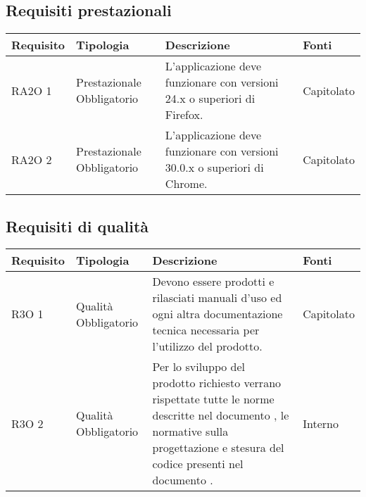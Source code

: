 \subsection{Requisiti prestazionali }

      \begin{center}
      \bgroup
      \def\arraystretch{1.8}
      \begin{longtable}{ | l | p{2cm} | p{5cm} | p{1.7cm} |}
    
      \cellcolor[gray]{0.9} \textbf{Requisito} & \cellcolor[gray]{0.9} \textbf{Tipologia} 
      & \cellcolor[gray]{0.9} \textbf{Descrizione} & \cellcolor[gray]{0.9} \textbf{Fonti} \\ \hline
      
        RA2O 1 & Prestazionale \newline  Obbligatorio  & L’applicazione deve funzionare con versioni 24.x o superiori di Firefox. &  Capitolato \newline  \\ \hline      
        RA2O 2 & Prestazionale \newline  Obbligatorio  & L’applicazione deve funzionare con versioni 30.0.x o superiori di Chrome. &  Capitolato \newline  \\ \hline
      \end{longtable}
      \egroup
      \end{center}  
\clearpage

\subsection{Requisiti di qualità }

      \begin{center}
      \bgroup
      \def\arraystretch{1.8}
      \begin{longtable}{ | l | p{2cm} | p{5cm} | p{1.7cm} |}
    
      \cellcolor[gray]{0.9} \textbf{Requisito} & \cellcolor[gray]{0.9} \textbf{Tipologia} 
      & \cellcolor[gray]{0.9} \textbf{Descrizione} & \cellcolor[gray]{0.9} \textbf{Fonti} \\ \hline
      
        R3O 1 & Qualità \newline  Obbligatorio  & Devono essere prodotti e rilasciati manuali d'uso ed ogni altra documentazione tecnica necessaria per l’utilizzo del prodotto. &  Capitolato \newline  \\ \hline      
        R3O 2 & Qualità \newline  Obbligatorio  & Per lo sviluppo del prodotto richiesto verrano rispettate tutte le norme descritte nel documento \NormeDiProgetto{}, le normative sulla progettazione e stesura del codice presenti nel  documento \PianoDiQualifica{} . &  Interno \newline  \\ \hline
      \end{longtable}
      \egroup
      \end{center}  
\clearpage


